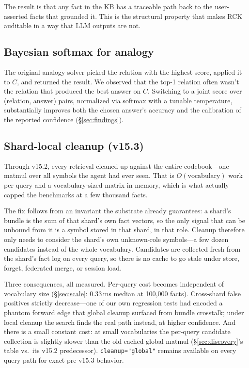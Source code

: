 \documentclass[11pt]{article}
\begin{document}
The result is that any fact in the KB has a traceable path back to
the user-asserted facts that grounded it. This is the structural
property that makes RCK auditable in a way that LLM outputs are not.

\subsection{Bayesian softmax for analogy}

The original analogy solver picked the relation with the highest
score, applied it to $C$, and returned the result. We observed that
the top-1 relation often wasn't the relation that produced the
best answer on $C$. Switching to a joint score over (relation,
answer) pairs, normalized via softmax with a tunable temperature,
substantially improves both the chosen answer's accuracy and the
calibration of the reported confidence (\S\ref{sec:findings}).

\subsection{Shard-local cleanup (v15.3)}
\label{sec:localcleanup}

Through v15.2, every retrieval cleaned up against the entire
codebook---one matmul over all symbols the agent had ever seen. That
is $O(\text{vocabulary})$ work per query and a vocabulary-sized
matrix in memory, which is what actually capped the benchmarks at a
few thousand facts.

The fix follows from an invariant the substrate already guarantees:
a shard's bundle is the sum of that shard's own fact vectors, so the
only signal that can be unbound from it is a symbol stored in that
shard, in that role. Cleanup therefore only needs to consider the
shard's own unknown-role symbols---a few dozen candidates instead of
the whole vocabulary. Candidates are collected fresh from the
shard's fact log on every query, so there is no cache to go stale
under store, forget, federated merge, or session load.

Three consequences, all measured. Per-query cost becomes independent
of vocabulary size (\S\ref{sec:scale}: 0.33\,ms median at 100{,}000
facts). Cross-shard false positives strictly decrease---one of our
own regression tests had encoded a phantom forward edge that global
cleanup surfaced from bundle crosstalk; under local cleanup the
search finds the real path instead, at higher confidence. And there
is a small constant cost: at small vocabularies the per-query
candidate collection is slightly slower than the old cached global
matmul (\S\ref{sec:discovery}'s table vs.\ its v15.2 predecessor).
\texttt{cleanup="global"} remains available on every query path for
exact pre-v15.3 behavior.
\end{document}
